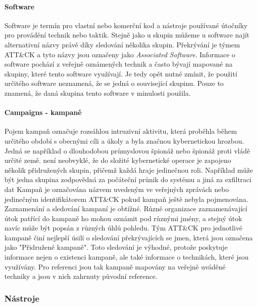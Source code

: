 \paragraph{Software}
Software je termín pro vlastní nebo komerční kod a nástroje používané útočníky pro provádění technik nebo taktik.
Stejně jako u skupin můžeme u software najít alternativní názvy právě díky sledování několika skupin.
Překrývání je týmem ATT\&CK a tyto názvy jsou označeny jako \textit{Associated Software}.
Informace o software pochází z veřejně oznámených technik a často bývají mapované na skupiny, které tento software využívají.
Je tedy opět nutné zmínit, že použití určitého software neznamená, že se jedná o související skupinu.
Pouze to znamená, že daná skupina tento software v minulosti použila.\cite{Mitre_software}


\paragraph{Campaigns - kampaně}
Pojem kampaň označuje rozsáhlou intruzivní aktivitu, která proběhla během určitého období s obecnými cíli a úkoly a byla značnou kybernetickou hrozbou.
Jedná se například o dlouhodobou průmyslovou špionáž nebo špionáž proti vládě určité země.
není neobvyklé, že do složité kybernetické operace je zapojeno několik přidružených skupin, přičemž každá hraje jedinečnou roli.
Například může být jedna skupina zodpovědná za počáteční průnik do systému a jiná za exfiltraci dat
Kampaň je označována názvem uvedeným ve veřejných zprávách nebo jedinečným identifikátorem ATT\&CK pokud kampaň ještě nebyla pojmenována.
Zaznamenání a sledování kampaní je obtížné.
Různé organizace zaznamenávající útok patřící do kampaně ho mohou oznámit pod různými jmény, a stejný útok navíc může být popsán z různých úhlů pohledu.
Tým ATT\&CK pro jednotlivé kampaně činí nejlepší úsilí o sledování překrývajících se jmen, která jsou označena jako "Přidružené kampaně".
Toto sledování je výhodné, protože poskytuje informace nejen o existenci kampaně, ale také informace o technikách, které jsou využívány.
Pro referenci jsou tak kampaně mapovány na veřejně uváděné techniky a jsou v nich zahrnuty původní reference.\cite{Mitre_campaigns}

\subsubsection{Nástroje}
~\label{fig:OpenSourceTestTools}

